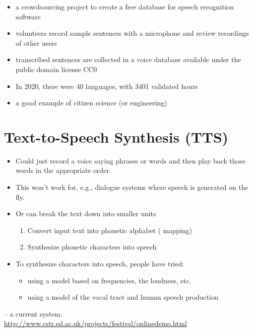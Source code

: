\documentclass[a4paper,landscape,headrule,footrule,xetex]{foils}
\begin{document}
\begin{itemize}
\item a crowdsourcing project to create a free database for speech
  recognition software
\item volunteers record sample sentences with a microphone and review
  recordings of other users
\item transcribed sentences are collected in a voice database
  available under the public domain license CC0
\item In 2020, there were 40 languages, with 3401 validated hours
\item a good example of citizen science (or engineering)
\end{itemize}
\section{Text-to-Speech Synthesis (TTS)}

\begin{itemize}
\item Could just record a voice saying phrases or words and then play back those words in the appropriate order.
\item This won't work for, e.g., dialogue systems where speech is generated on the fly.
\item Or can break the text down into smaller units
  \begin{enumerate}
  \item Convert input text into phonetic alphabet ( mapping)
  \item Synthesize phonetic characters into speech 
  \end{enumerate}
\item  To synthesize characters into speech, people have tried:
  \begin{itemize}
  \item using a model based on frequencies, the loudness, etc.
  \item using a model of the vocal tract and human speech production
  \end{itemize}
\end{itemize}


 -- a current  system:
\\ \url{http://www.cstr.ed.ac.uk/projects/festival/onlinedemo.html}
\end{document}
